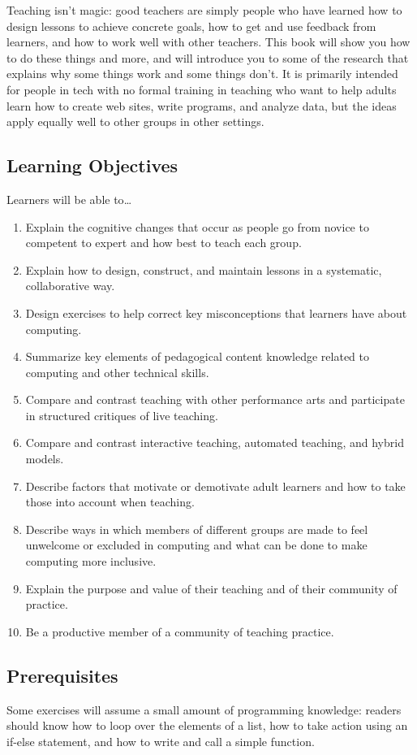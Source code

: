 Teaching isn't magic: good teachers are simply people who have learned
how to design lessons to achieve concrete goals, how to get and use
feedback from learners, and how to work well with other teachers.
This book will show you how to do these things and more, and will
introduce you to some of the research that explains why some things
work and some things don't.  It is primarily intended for people in
tech with no formal training in teaching who want to help adults learn
how to create web sites, write programs, and analyze data, but the
ideas apply equally well to other groups in other settings.

\subsection*{Learning Objectives}

Learners will be able to{\ldots}

\begin{enumerate}
\item
  Explain the cognitive changes that occur as people go from novice to
  competent to expert and how best to teach each group.
\item
  Explain how to design, construct, and maintain lessons in a
  systematic, collaborative way.
\item
  Design exercises to help correct key misconceptions that learners
  have about computing.
\item
  Summarize key elements of pedagogical content knowledge related to
  computing and other technical skills.
\item
  Compare and contrast teaching with other performance arts and
  participate in structured critiques of live teaching.
\item
  Compare and contrast interactive teaching, automated teaching, and
  hybrid models.
\item
  Describe factors that motivate or demotivate adult learners and
  how to take those into account when teaching.
\item
  Describe ways in which members of different groups are made to feel
  unwelcome or excluded in computing and what can be done to make
  computing more inclusive.
\item
  Explain the purpose and value of their teaching and of their
  community of practice.
\item
  Be a productive member of a community of teaching practice.
\end{enumerate}

\subsection*{Prerequisites}

Some exercises will assume a small amount of programming knowledge:
readers should know how to loop over the elements of a list, how to
take action using an if-else statement, and how to write and call a
simple function.
